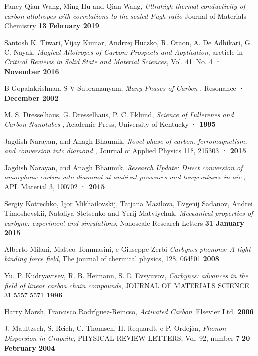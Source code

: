 \documentclass[a4paper,titlepage]{book}
\begin{document}
\begin{thebibliography}{99}
Fancy Qian Wang, Ming Hu and Qian Wang, \textit{Ultrahigh thermal conductivity of carbon allotropes with correlations to the scaled Pugh ratio} Journal of Materials Chemistry \textbf{13 February 2019} 


Santosh K. Tiwari, Vijay Kumar, Andrzej Huczko, R. Oraon, A. De Adhikari, G. C. Nayak,
 \textit{Magical Allotropes of Carbon: Prospects and Application}, arcticle in \textit {Critical Reviews in Solid State and Material Sciences},  Vol. 41, No. 4 \textbf{ · November 2016 }

B Gopalakrishnan, S V Subramanyam,  \textit{Many Phases of Carbon }, Resonance \textbf {· December 2002}

M. S. Dresselhaus, G. Dresselhaus, P. C. Eklund,  \textit{Science of Fullerenes and Carbon Nanotubes }, Academic Press, University of Kentucky
\textbf {· 1995}


  Jagdish Narayan, and Anagh Bhaumik, \textit{Novel phase of carbon, ferromagnetism, and conversion into diamond }, Journal of Applied Physics 118, 215303
\textbf {· 2015}

Jagdish Narayan, and Anagh Bhaumik, \textit{Research Update: Direct conversion of amorphous carbon into diamond at ambient pressures and temperatures in air },  APL Material 3, 100702
\textbf {· 2015}
 

Sergiy Kotrechko, Igor Mikhailovskij, Tatjana Mazilova, Evgenij Sadanov, Andrei Timoshevskii, Nataliya Stetsenko and Yurij Matviychuk, \textit{Mechanical properties of carbyne: experiment and simulations},  Nanoscale Research Letters
\textbf {31 January 2015}

Alberto Milani, Matteo Tommasini, e Giuseppe Zerbi
\textit{Carbynes phonons: A tight binding force field}, The journal of chermical physics, 128, 064501 \textbf {2008}

Yu. P. Kudryavtsev, R. B. Heimann, S. E. Evsyuvov, \textit{Carbynes: advances in the field of linear carbon chain compounds},  JOURNAL OF MATERIALS SCIENCE 31 5557-5571
\textbf {1996}

Harry Marsh, Francisco Rodríguez-Reinoso, \textit{Activated Carbon},  Elsevier Ltd. \textbf {2006}

J. Maultzsch, S. Reich, C. Thomsen, H. Requardt, e P. Ordejòn, \textit{Phonon Dispersion in Graphite},  PHYSICAL REVIEW LETTERS, Vol. 92, number 7 \textbf {20 February 2004}


\end{thebibliography}
\end{document}
